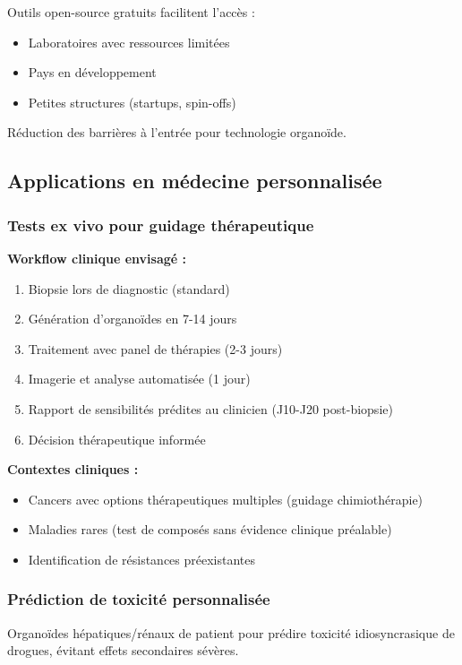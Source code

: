 Outils open-source gratuits facilitent l'accès :
\begin{itemize}
    \item Laboratoires avec ressources limitées
    \item Pays en développement
    \item Petites structures (startups, spin-offs)
\end{itemize}

Réduction des barrières à l'entrée pour technologie organoïde.

\subsection{Applications en médecine personnalisée}

\subsubsection{Tests ex vivo pour guidage thérapeutique}

\textbf{Workflow clinique envisagé :}
\begin{enumerate}
    \item Biopsie lors de diagnostic (standard)
    \item Génération d'organoïdes en 7-14 jours
    \item Traitement avec panel de thérapies (2-3 jours)
    \item Imagerie et analyse automatisée (1 jour)
    \item Rapport de sensibilités prédites au clinicien (J10-J20 post-biopsie)
    \item Décision thérapeutique informée
\end{enumerate}

\textbf{Contextes cliniques :}
\begin{itemize}
    \item Cancers avec options thérapeutiques multiples (guidage chimiothérapie)
    \item Maladies rares (test de composés sans évidence clinique préalable)
    \item Identification de résistances préexistantes
\end{itemize}

\subsubsection{Prédiction de toxicité personnalisée}

Organoïdes hépatiques/rénaux de patient pour prédire toxicité idiosyncrasique de drogues, évitant effets secondaires sévères.


